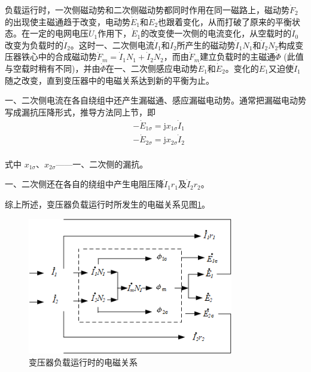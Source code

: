 \documentclass{book}
\begin{document}
负载运行时，一次侧磁动势和二次侧磁动势都同时作用在同一磁路上，磁动势${{\dot{F}}_{2}}$的出现使主磁通趋于改变，电动势${{\dot{E}}_{1}}$和${{\dot{E}}_{2}}$也跟着变化，从而打破了原来的平衡状态。在一定的电网电压${{\dot{U}}_{1}}$作用下，${{\dot{E}}_{1}}$的改变使一次侧的电流变化，从空载时的${{\dot{I}}_{0}}$改变为负载时的${{\dot{I}}_{2}}$。这时一、二次侧电流${{\dot{I}}_{1}}$和${{\dot{I}}_{2}}$所产生的磁动势${{\dot{I}}_{1}}{{N}_{1}}$和${{\dot{I}}_{2}}{{N}_{2}}$构成变压器铁心中的合成磁动势${{\dot{F}}_{m}}={{\dot{I}}_{1}}{{N}_{1}}+{{\dot{I}}_{2}}{{N}_{2}}$，而由${{\dot{F}}_{m}}$建立负载时的主磁通$\dot{\Phi }$ (此值与空载时稍有不同)，并由$\dot{\Phi }$在一、二次侧感应电动势${{\dot{E}}_{1}}$和${{\dot{E}}_{2}}$。变化的${{\dot{E}}_{1}}$又迫使${{\dot{I}}_{1}}$随之改变，直到变压器中的电磁关系达到新的平衡为止。

一、二次侧电流在各自绕组中还产生漏磁通、感应漏磁电动势。通常把漏磁电动势写成漏抗压降形式，推导方法同上节，即
\begin{equation}
\begin{aligned}
& -{{{\dot{E}}}_{1\sigma }}=\text{j}{{x}_{1\sigma }}{{{\dot{I}}}_{1}} \\ 
& -{{{\dot{E}}}_{2\sigma }}=\text{j}{{x}_{2\sigma }}{{{\dot{I}}}_{2}} \\ 
\end{aligned}
\label{2-16}
\end{equation}

式中 ${{x}_{1\sigma }}$、${{x}_{2\sigma }}$——一、二次侧的漏抗。

一、二次侧还在各自的绕组中产生电阻压降${{\dot{I}}_{1}}{{r}_{1}}$及${{\dot{I}}_{2}}{{r}_{2}}$。

综上所述，变压器负载运行时所发生的电磁关系见图\ref{fig_3.9}。
\begin{figure}[H]
	\centering
	\includegraphics[width=0.80\textwidth]{3-9g.png}
	\caption{变压器负载运行时的电磁关系}
	\label{fig_3.9}
\end{figure}
\end{document}
